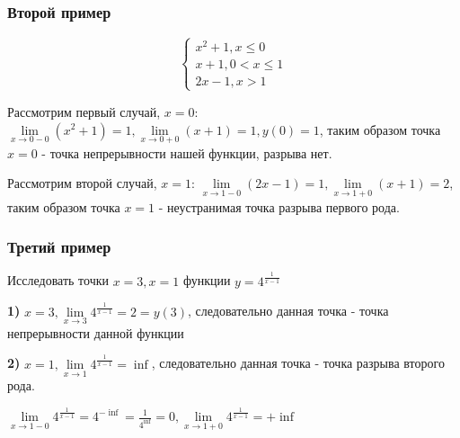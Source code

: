 \documentclass{article}
\begin{document}
\subsubsection{Второй пример}

\begin{equation}
    \begin{cases}
        x^2 + 1, x \le 0 \\
        x + 1, 0 < x \le 1 \\
        2x - 1, x > 1
    \end{cases}
\end{equation}

Рассмотрим первый случай, $x = 0$: $\lim\limits_{x \to 0 - 0} (x^2 + 1) = 1, \lim\limits_{x \to 0 + 0} (x + 1) = 1, y(0) = 1$, таким образом точка $x = 0$ - точка непрерывности нашей функции, разрыва нет.

Рассмотрим второй случай, $x = 1$: $\lim\limits_{x \to 1 - 0} (2x - 1) = 1, \lim\limits_{x \to 1 + 0} (x + 1) = 2$, таким образом точка $x = 1$ - неустранимая точка разрыва первого рода.

\subsubsection{Третий пример}

Исследовать точки $x = 3, x = 1$ функции $y = 4^\frac{1}{x - 1}$

\textbf{1)} $x = 3, \lim\limits_{x \to 3} 4^\frac{1}{x - 1} = 2 = y(3)$, следовательно данная точка - точка непрерывности данной функции

\textbf{2)} $x = 1, \lim\limits_{x \to 1} 4^\frac{1}{x - 1} = \inf$, следовательно данная точка - точка разрыва второго рода.

$\lim\limits_{x \to 1 - 0} 4^{\frac{1}{x - 1}} = 4^{-\inf} = \frac{1}{4^{\inf}} = 0, \lim\limits_{x \to 1 + 0} 4^\frac{1}{x - 1} = +\inf$
\end{document}

